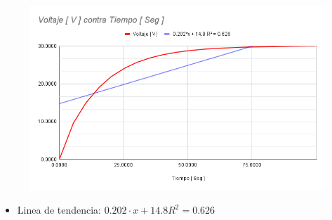 \documentclass[twocolumn, 12pt]{article}
\begin{document}
\begin{figure}[H]
    \centering
    \includegraphics[width=\linewidth]{./Images/Voltaje [ V ] contra Tiempo [ Seg ].png}
\end{figure}

\begin{itemize}[label=$\triangleright$]
    \item Linea de tendencia:\hfill \break{} $0.202 \cdot x + 14.8
              R^2 = 0.626$
\end{itemize}
\end{document}

